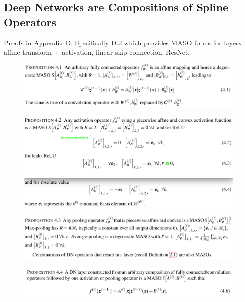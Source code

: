 \documentclass{article}
\begin{document}
\subsection{Deep Networks are Compositions of Spline Operators}

Proofs in Appendix D. Specifically D.2 which provides MASO forms for layers affine transform + activation, linear skip-connection, ResNet.

\begin{figure}[h]
	\begin{center}
		\includegraphics[width=.8\linewidth]{Figure/prop4p1}
		\label{fig:prop4p1}
	\end{center}
\end{figure}

\begin{figure}[h]
	\begin{center}
		\includegraphics[width=.8\linewidth]{Figure/prop4p2}
		\label{fig:prop4p2}
	\end{center}
\end{figure}


\begin{figure}[h]
	\begin{center}
		\includegraphics[width=.8\linewidth]{Figure/prop4p3}
		\label{fig:prop4p3}
	\end{center}
\end{figure}

\begin{figure}[h]
	\begin{center}
		\includegraphics[width=.8\linewidth]{Figure/prop4p4}
		\label{fig:prop4p4}
	\end{center}
\end{figure}
\end{document}
